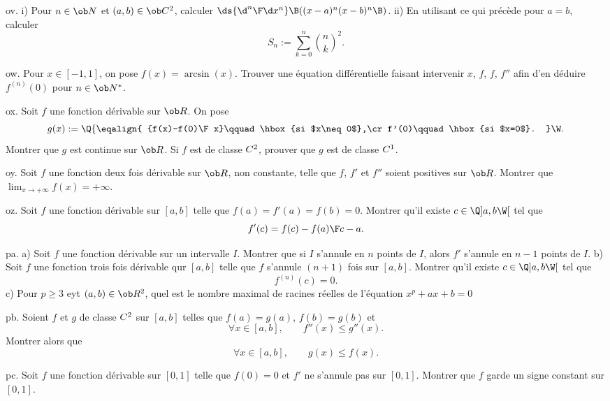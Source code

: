 \exo [Level=1,Fight=1,Learn=1,Field=\Dérivation,Type=\Exercices,Origin=] ov. 
i) Pour $n\in\ob N$ et $(a,b)\in\ob C^2$, calculer $\ds {\d^n\F\d x^n}\B((x-a)^n(x-b)^n\B)$. \pn 
ii) En utilisant ce qui précède pour $a=b$, calculer 
$$ 
S_n:=\sum_{k=0}^n{n\choose k}^2.
$$ 

\exo [Level=1,Fight=1,Learn=1,Field=\Fonctions,Type=\Exercices,Origin=] ow. Pour $x\in[-1,1]$, on pose $f(x)=\arcsin(x)$. Trouver une équation différentielle  faisant intervenir $x$, $f$, $f$, $f''$ afin d'en déduire $f^{(n)}(0)$ pour $n\in\ob N^*$. 

\exo [Level=1,Fight=1,Learn=1,Field=\Dérivation,Type=\Exercices,Origin=] ox. 
Soit $f$ une fonction dérivable sur $\ob R$. On pose 
$$
g(x):=\Q\{
\eqalign{
{f(x)-f(0)\F x}\qquad\hbox{si $x\neq 0$},\cr
f'(0)\qquad\hbox{si $x=0$}.
}
\W.
$$
Montrer que $g$ est continue sur $\ob R$. Si $f$ est de classe $\sc C^2$, prouver que $g$ est de classe $\sc C^1$. 

\exo [Level=1,Fight=1,Learn=1,Field=\Intégration,Type=\Exercices,Origin=] oy. 
Soit $f$ une fonction deux fois dérivable sur $\ob R$, non constante, telle que $f$, $f'$ et $f''$ soient positives sur $\ob R$. Montrer que $\lim_{x\to+\infty}f(x)=+\infty$. 

\exo [Level=1,Fight=1,Learn=1,Field=\ThéorèmeDeRolle,Type=\Exercices,Origin=,Indication=
{On pourra utiliser la fonction $g$ définie par $\ds g(x)={f(x)-f(a)\F x-a}$.}] oz. 
Soit $f$ une fonction dérivable sur $[a,b]$ telle que $f(a)=f'(a)=f(b)=0$. Montrer qu'il existe $c\in\Q]a,b\W[$ tel que 
$$
f'(c)={f(c)-f(a)\F c-a}.
$$

\exo [Level=1,Fight=3,Learn=3,Field=\ThéorèmeDeRolle,Type=\Exercices,Origin=] pa. 
a) Soit $f$ une fonction dérivable sur un intervalle $I$. \pn Montrer que si $I$ s'annule en $n$ points de $I$, alors $f'$ s'annule en $n-1$ points de $I$. \pn
b) Soit $f$ une fonction trois fois dérivable qur $[a,b]$ telle que $f$ s'annule $(n+1)$ fois sur $[a,b]$. \pn 
Montrer qu'il existe $c\in\Q]a,b\W[$ tel que $$
f^{(n)}(c)=0.
$$ 
c) Pour $p\ge 3$ eyt $(a,b)\in\ob R^2$, quel est le nombre maximal de racines réelles de l'équation $x^p+ax+b=0$


\exo [Level=1,Fight=2,Learn=2,Field=\ThéorèmeDeRolle,Type=\Exercices,Origin=] pb. 
Soient $f$ et $g$ de classe $\sc C^2$ sur $[a,b]$ telles que $f(a)=g(a)$, $f(b)=g(b)$ et 
$$
\forall x\in[a,b],\qquad f''(x)\le g''(x). 
$$
Montrer alors que 
$$
\forall x\in[a,b], \qquad g(x)\le f(x).
$$ 

\exo [Level=1,Fight=1,Learn=1,Field=\ThéorèmeDeRolle,Type=\Exercices,Origin=,Indication={On pourra raisonner par l'absurde.}] pc. 
Soit $f$ une fonction dérivable sur $[0,1]$ telle que $f(0)=0$ et $f'$ ne s'annule pas sur $[0,1]$. \pn
Montrer que $f$ garde un signe constant sur $[0,1]$.  

